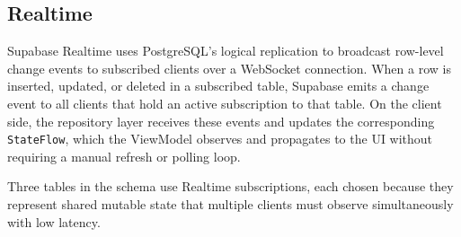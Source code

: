 %
%
%
%
%
%
%




\subsection{Realtime}
\label{subsec:arch-realtime}

Supabase Realtime uses PostgreSQL's logical replication to broadcast row-level change events to subscribed clients over a WebSocket connection. 
When a row is inserted, updated, or deleted in a subscribed table, Supabase emits a change event to all clients that hold an active subscription to that table. 
On the client side, the repository layer receives these events and updates the corresponding \texttt{StateFlow}, which the ViewModel observes and propagates to the UI without requiring a manual refresh or polling loop.

Three tables in the schema use Realtime subscriptions, each chosen because they represent shared mutable state that multiple clients must observe simultaneously with low latency.

